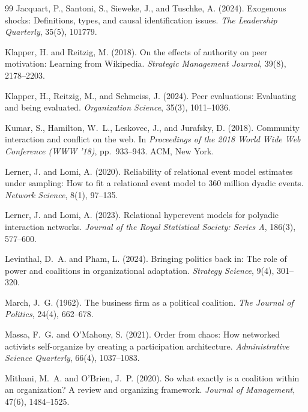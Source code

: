 \documentclass[11pt]{article}
\begin{document}
\begin{thebibliography}{99}
Jacquart, P., Santoni, S., Sieweke, J., and Tuschke, A. (2024).
\newblock Exogenous shocks: Definitions, types, and causal identification issues.
\newblock \emph{The Leadership Quarterly}, 35(5), 101779.

Klapper, H. and Reitzig, M. (2018).
\newblock On the effects of authority on peer motivation: Learning from {W}ikipedia.
\newblock \emph{Strategic Management Journal}, 39(8), 2178--2203.

Klapper, H., Reitzig, M., and Schmeiss, J. (2024).
\newblock Peer evaluations: Evaluating and being evaluated.
\newblock \emph{Organization Science}, 35(3), 1011--1036.

Kumar, S., Hamilton, W.~L., Leskovec, J., and Jurafsky, D. (2018).
\newblock Community interaction and conflict on the web.
\newblock In \emph{Proceedings of the 2018 World Wide Web Conference (WWW '18)}, pp.~933--943. ACM, New York.

Lerner, J. and Lomi, A. (2020).
\newblock Reliability of relational event model estimates under sampling: How to fit a relational event model to 360 million dyadic events.
\newblock \emph{Network Science}, 8(1), 97--135.

Lerner, J. and Lomi, A. (2023).
\newblock Relational hyperevent models for polyadic interaction networks.
\newblock \emph{Journal of the Royal Statistical Society: Series A}, 186(3), 577--600.

Levinthal, D.~A. and Pham, L. (2024).
\newblock Bringing politics back in: The role of power and coalitions in organizational adaptation.
\newblock \emph{Strategy Science}, 9(4), 301--320.

March, J.~G. (1962).
\newblock The business firm as a political coalition.
\newblock \emph{The Journal of Politics}, 24(4), 662--678.

Massa, F.~G. and O'Mahony, S. (2021).
\newblock Order from chaos: How networked activists self-organize by creating a participation architecture.
\newblock \emph{Administrative Science Quarterly}, 66(4), 1037--1083.

Mithani, M.~A. and O'Brien, J.~P. (2020).
\newblock So what exactly is a coalition within an organization? A review and organizing framework.
\newblock \emph{Journal of Management}, 47(6), 1484--1525.


\end{thebibliography}
\end{document}
